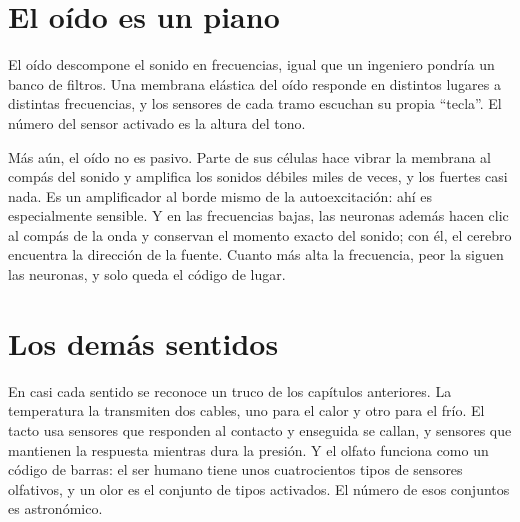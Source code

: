 \section*{El oído es un piano}

El oído descompone el sonido en frecuencias, igual que un ingeniero pondría un banco de filtros. Una membrana elástica del oído responde en distintos lugares a distintas frecuencias, y los sensores de cada tramo escuchan su propia “tecla”. El número del sensor activado es la altura del tono.


Más aún, el oído no es pasivo. Parte de sus células hace vibrar la membrana al compás del sonido y amplifica los sonidos débiles miles de veces, y los fuertes casi nada. Es un amplificador al borde mismo de la autoexcitación: ahí es especialmente sensible. Y en las frecuencias bajas, las neuronas además hacen clic al compás de la onda y conservan el momento exacto del sonido; con él, el cerebro encuentra la dirección de la fuente. Cuanto más alta la frecuencia, peor la siguen las neuronas, y solo queda el código de lugar.

\section*{Los demás sentidos}

En casi cada sentido se reconoce un truco de los capítulos anteriores. La temperatura la transmiten dos cables, uno para el calor y otro para el frío. El tacto usa sensores que responden al contacto y enseguida se callan, y sensores que mantienen la respuesta mientras dura la presión. Y el olfato funciona como un código de barras: el ser humano tiene unos cuatrocientos tipos de sensores olfativos, y un olor es el conjunto de tipos activados. El número de esos conjuntos es astronómico.

